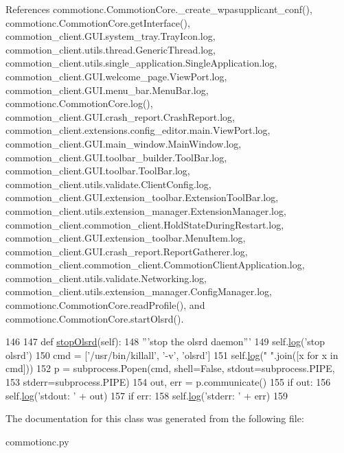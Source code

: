 References commotionc.\-Commotion\-Core.\-\_\-create\-\_\-wpasupplicant\-\_\-conf(), commotionc.\-Commotion\-Core.\-get\-Interface(), commotion\-\_\-client.\-G\-U\-I.\-system\-\_\-tray.\-Tray\-Icon.\-log, commotion\-\_\-client.\-utils.\-thread.\-Generic\-Thread.\-log, commotion\-\_\-client.\-utils.\-single\-\_\-application.\-Single\-Application.\-log, commotion\-\_\-client.\-G\-U\-I.\-welcome\-\_\-page.\-View\-Port.\-log, commotion\-\_\-client.\-G\-U\-I.\-menu\-\_\-bar.\-Menu\-Bar.\-log, commotionc.\-Commotion\-Core.\-log(), commotion\-\_\-client.\-G\-U\-I.\-crash\-\_\-report.\-Crash\-Report.\-log, commotion\-\_\-client.\-extensions.\-config\-\_\-editor.\-main.\-View\-Port.\-log, commotion\-\_\-client.\-G\-U\-I.\-main\-\_\-window.\-Main\-Window.\-log, commotion\-\_\-client.\-G\-U\-I.\-toolbar\-\_\-builder.\-Tool\-Bar.\-log, commotion\-\_\-client.\-G\-U\-I.\-toolbar.\-Tool\-Bar.\-log, commotion\-\_\-client.\-utils.\-validate.\-Client\-Config.\-log, commotion\-\_\-client.\-G\-U\-I.\-extension\-\_\-toolbar.\-Extension\-Tool\-Bar.\-log, commotion\-\_\-client.\-utils.\-extension\-\_\-manager.\-Extension\-Manager.\-log, commotion\-\_\-client.\-commotion\-\_\-client.\-Hold\-State\-During\-Restart.\-log, commotion\-\_\-client.\-G\-U\-I.\-extension\-\_\-toolbar.\-Menu\-Item.\-log, commotion\-\_\-client.\-G\-U\-I.\-crash\-\_\-report.\-Report\-Gatherer.\-log, commotion\-\_\-client.\-commotion\-\_\-client.\-Commotion\-Client\-Application.\-log, commotion\-\_\-client.\-utils.\-validate.\-Networking.\-log, commotion\-\_\-client.\-utils.\-extension\-\_\-manager.\-Config\-Manager.\-log, commotionc.\-Commotion\-Core.\-read\-Profile(), and commotionc.\-Commotion\-Core.\-start\-Olsrd().


\begin{DoxyCode}
146 
147     \textcolor{keyword}{def }\hyperlink{classcommotionc_1_1CommotionCore_a2cadf11999f9a99eb148957fafe80bbe}{stopOlsrd}(self):
148         \textcolor{stringliteral}{'''stop the olsrd daemon'''}
149         self.\hyperlink{classcommotionc_1_1CommotionCore_adc7b8770d8f4a8a63789a96d6283677a}{log}(\textcolor{stringliteral}{'stop olsrd'})
150         cmd = [\textcolor{stringliteral}{'/usr/bin/killall'}, \textcolor{stringliteral}{'-v'}, \textcolor{stringliteral}{'olsrd'}]
151         self.\hyperlink{classcommotionc_1_1CommotionCore_adc7b8770d8f4a8a63789a96d6283677a}{log}(\textcolor{stringliteral}{" "}.join([x \textcolor{keywordflow}{for} x \textcolor{keywordflow}{in} cmd]))
152         p = subprocess.Popen(cmd, shell=\textcolor{keyword}{False}, stdout=subprocess.PIPE,
153                              stderr=subprocess.PIPE)
154         out, err = p.communicate()
155         \textcolor{keywordflow}{if} out:
156             self.\hyperlink{classcommotionc_1_1CommotionCore_adc7b8770d8f4a8a63789a96d6283677a}{log}(\textcolor{stringliteral}{'stdout: '} + out)
157         \textcolor{keywordflow}{if} err:
158             self.\hyperlink{classcommotionc_1_1CommotionCore_adc7b8770d8f4a8a63789a96d6283677a}{log}(\textcolor{stringliteral}{'stderr: '} + err)
159 

\end{DoxyCode}


The documentation for this class was generated from the following file\-:\begin{DoxyCompactItemize}
\item 
commotionc.\-py\end{DoxyCompactItemize}
